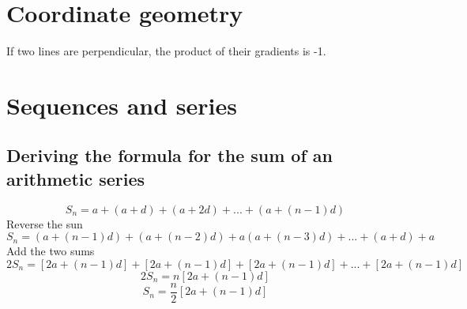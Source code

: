 \documentclass{article}[18pt]
\begin{document}
\section{Coordinate geometry}
If two lines are perpendicular, the product of their gradients is -1.
\section{Sequences and series}
\subsection{Deriving the formula for the sum of an arithmetic series}
$$S_n=a+(a+d)+(a+2d)+...+(a+(n-1)d)$$
Reverse the sun
$$S_n=(a+(n-1)d)+(a+(n-2)d)+a(a+(n-3)d)+...+(a+d)+a$$
Add the two sums
$$2S_n=[2a+(n-1)d]+[2a+(n-1)d]+[2a+(n-1)d]+...+[2a+(n-1)d]$$
$$2S_n=n[2a+(n-1)d]$$
$$S_n=\frac{n}{2}[2a+(n-1)d]$$
\end{document}
